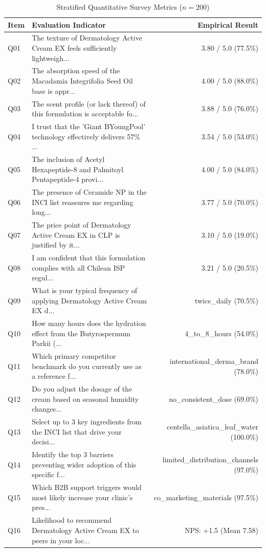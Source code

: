 \documentclass[10pt,twocolumn,a4paper]{article}
\begin{document}
\begin{table}[t]
\centering
\caption{Stratified Quantitative Survey Metrics ($n = 200$)}
\label{tab:metrics}
\small
\begin{tabularx}{\textwidth}{l X r}
\toprule
\textbf{Item} & \textbf{Evaluation Indicator} & \textbf{Empirical Result} \\
\midrule
Q01 & The texture of Dermatology Active Cream EX feels sufficiently lightweigh... & 3.80 / 5.0 (77.5\%) \\
Q02 & The absorption speed of the Macadamia Integrifolia Seed Oil base is appr... & 4.00 / 5.0 (88.0\%) \\
Q03 & The scent profile (or lack thereof) of this formulation is acceptable fo... & 3.88 / 5.0 (76.0\%) \\
Q04 & I trust that the 'Giant BYoungPool' technology effectively delivers 57\% ... & 3.54 / 5.0 (53.0\%) \\
Q05 & The inclusion of Acetyl Hexapeptide-8 and Palmitoyl Pentapeptide-4 provi... & 4.00 / 5.0 (84.0\%) \\
Q06 & The presence of Ceramide NP in the INCI list reassures me regarding long... & 3.77 / 5.0 (70.0\%) \\
Q07 & The price point of Dermatology Active Cream EX in CLP is justified by it... & 3.10 / 5.0 (19.0\%) \\
Q08 & I am confident that this formulation complies with all Chilean ISP regul... & 3.21 / 5.0 (20.5\%) \\
Q09 & What is your typical frequency of applying Dermatology Active Cream EX d... & twice\_daily (70.5\%) \\
Q10 & How many hours does the hydration effect from the Butyrospermum Parkii (... & 4\_to\_8\_hours (54.0\%) \\
Q11 & Which primary competitor benchmark do you currently use as a reference f... & international\_derma\_brand (78.0\%) \\
Q12 & Do you adjust the dosage of the cream based on seasonal humidity changes... & no\_consistent\_dose (69.0\%) \\
Q13 & Select up to 3 key ingredients from the INCI list that drive your decisi... & centella\_asiatica\_leaf\_water (100.0\%) \\
Q14 & Identify the top 3 barriers preventing wider adoption of this specific f... & limited\_distribution\_channels (97.0\%) \\
Q15 & Which B2B support triggers would most likely increase your clinic's pres... & co\_marketing\_materials (97.5\%) \\
Q16 & Likelihood to recommend Dermatology Active Cream EX to peers in your loc... & NPS: +1.5 (Mean 7.58) \\
\bottomrule
\end{tabularx}
\end{table}
\end{document}
